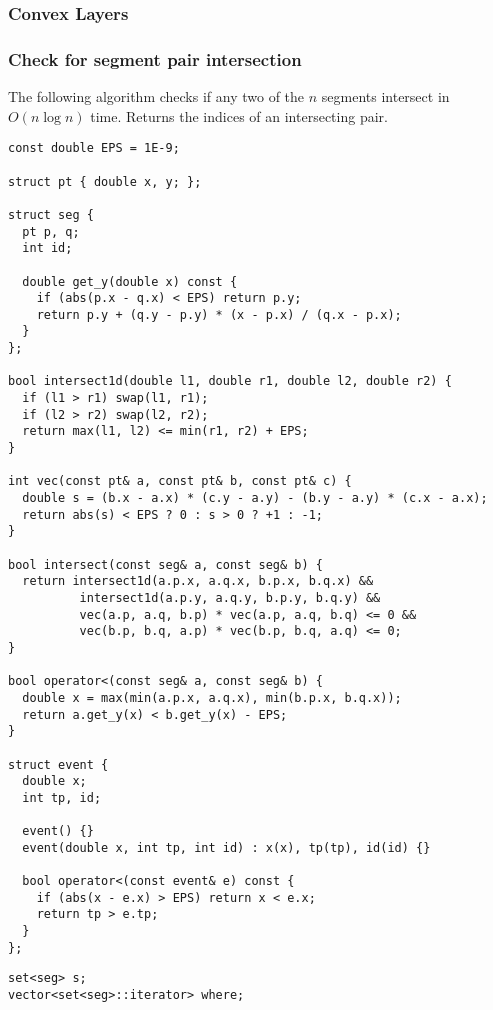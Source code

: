 \subsubsection{Convex Layers}

\newpage
\subsubsection{Check for segment pair intersection}

The following algorithm checks if any two of the $n$ segments intersect in $O(n \log{n})$ time.
Returns the indices of an intersecting pair.


\begin{center}
\begin{minipage}[t]{0.45\linewidth}
\begin{lstlisting}
const double EPS = 1E-9;

struct pt { double x, y; };

struct seg {
  pt p, q;
  int id;

  double get_y(double x) const {
    if (abs(p.x - q.x) < EPS) return p.y;
    return p.y + (q.y - p.y) * (x - p.x) / (q.x - p.x);
  }
};

bool intersect1d(double l1, double r1, double l2, double r2) {
  if (l1 > r1) swap(l1, r1);
  if (l2 > r2) swap(l2, r2);
  return max(l1, l2) <= min(r1, r2) + EPS;
}

int vec(const pt& a, const pt& b, const pt& c) {
  double s = (b.x - a.x) * (c.y - a.y) - (b.y - a.y) * (c.x - a.x);
  return abs(s) < EPS ? 0 : s > 0 ? +1 : -1;
}

bool intersect(const seg& a, const seg& b) {
  return intersect1d(a.p.x, a.q.x, b.p.x, b.q.x) &&
          intersect1d(a.p.y, a.q.y, b.p.y, b.q.y) &&
          vec(a.p, a.q, b.p) * vec(a.p, a.q, b.q) <= 0 &&
          vec(b.p, b.q, a.p) * vec(b.p, b.q, a.q) <= 0;
}

bool operator<(const seg& a, const seg& b) {
  double x = max(min(a.p.x, a.q.x), min(b.p.x, b.q.x));
  return a.get_y(x) < b.get_y(x) - EPS;
}

struct event {
  double x;
  int tp, id;

  event() {}
  event(double x, int tp, int id) : x(x), tp(tp), id(id) {}

  bool operator<(const event& e) const {
    if (abs(x - e.x) > EPS) return x < e.x;
    return tp > e.tp;
  }
};
\end{lstlisting}
\end{minipage}
\qquad
\begin{minipage}[t]{0.5\linewidth}
\begin{lstlisting}
set<seg> s;
vector<set<seg>::iterator> where;


\end{lstlisting}
\end{minipage}
\end{center}
